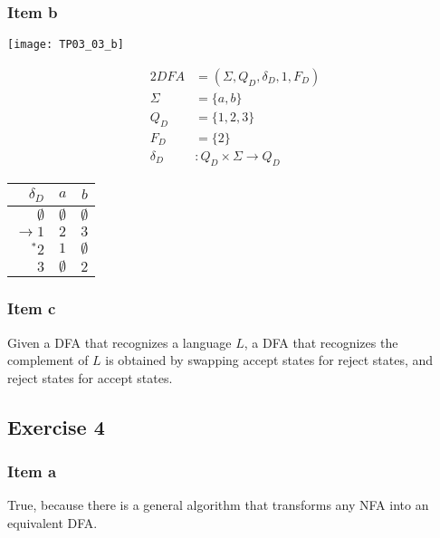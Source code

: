 {\subsubsection{Item b}
\begin{center} \texttt{[image: TP03\_03\_b]} \end{center}
\begin{center}
\begin{minipage}[c]{0.30\textwidth}
	\begin{alignat*}{2}
		DFA    &= (\Sigma, Q_D, \delta_D, 1, F_D)\\
		\Sigma &= \{a,b\}\\
		Q_D    &= \{1,2,3\}\\
		F_D    &= \{2\}\\
		\delta_D &\colon Q_D \times \Sigma \rightarrow Q_D
	\end{alignat*}
\end{minipage}%
\begin{minipage}[c]{0.20\textwidth}
	\begin{center}
	\begin{tabular}{ r | c c }
 		$\delta_D$ & $a$ & $b$ \\ \hline
 		$\emptyset    $ & $\emptyset$ & $\emptyset$ \\
 		$\rightarrow 1$ & $2        $ & $3        $ \\  
 		$^\ast       2$ & $1        $ & $\emptyset$ \\
 		$            3$ & $\emptyset$ & $2        $ \\
	\end{tabular}
	\end{center}
\end{minipage}
\end{center}
\subsubsection{Item c}
\label{subsubsec:03_03_c} Given a DFA that recognizes a language $L$, a DFA that recognizes the complement of $L$ is obtained by swapping accept states for reject states, and reject states for accept states.
\subsection{Exercise 4}
\subsubsection{Item a}
True, because there is a general algorithm that transforms any NFA into an equivalent DFA.
}
